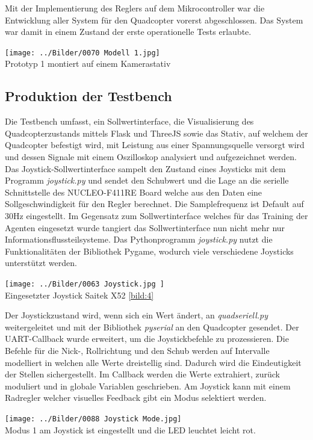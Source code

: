 Mit der Implementierung des Reglers auf dem Mikrocontroller war die Entwicklung aller System für den Quadcopter vorerst abgeschlossen. Das System war damit in einem Zustand der erste operationelle Tests erlaubte.
\begin{center}
	\texttt{[image: ../Bilder/0070 Modell 1.jpg]}{\\Prototyp 1 montiert auf einem Kamerastativ}
\end{center}


\subsection{\label{testbench:testbench}Produktion der Testbench}
Die Testbench umfasst, ein Sollwertinterface, die Visualisierung des Quadcopterzustands mittels Flask und ThreeJS sowie das Stativ, auf welchem der Quadcopter befestigt wird, mit Leistung aus einer Spannungsquelle versorgt wird und dessen Signale mit einem Oszilloskop analysiert und aufgezeichnet werden. Das Joystick-Sollwertinterface sampelt den Zustand eines Joysticks mit dem Programm \textit{joystick.py} und sendet den Schubwert und die Lage an die serielle Schnittstelle des NUCLEO-F411RE Board welche aus den Daten eine Sollgeschwindigkeit für den Regler berechnet. Die Samplefrequenz ist Default auf 30Hz eingestellt. Im Gegensatz zum Sollwertinterface welches für das Training der Agenten eingesetzt wurde tangiert das Sollwertinterface nun nicht mehr nur Informationsflussteilsysteme.
Das Pythonprogramm \textit{joystick.py} nutzt die Funktionalitäten der Bibliothek Pygame, wodurch viele verschiedene Joysticks unterstützt werden.\\
\begin{center}
	\texttt{[image: ../Bilder/0063 Joystick.jpg
	]}{\\Eingesetzter Joystick Saitek X52 \ref{bild:4}}
\end{center}
Der Joystickzustand wird, wenn sich ein Wert ändert, an \textit{quadseriell.py} weitergeleitet und mit der Bibliothek \textit{pyserial} an den Quadcopter gesendet. Der UART-Callback wurde erweitert, um die Joystickbefehle zu prozessieren. Die Befehle für die Nick-, Rollrichtung und den Schub werden auf Intervalle modelliert in welchen alle Werte dreistellig sind. Dadurch wird die Eindeutigkeit der Stellen sichergestellt. Im Callback werden die Werte extrahiert, zurück moduliert und in globale Variablen geschrieben. Am Joystick kann mit einem Radregler welcher visuelles Feedback gibt ein Modus selektiert werden.
\begin{center}
	\texttt{[image: ../Bilder/0088 Joystick Mode.jpg]}{\\Modus 1 am Joystick ist eingestellt und die LED leuchtet leicht rot.}
\end{center}
